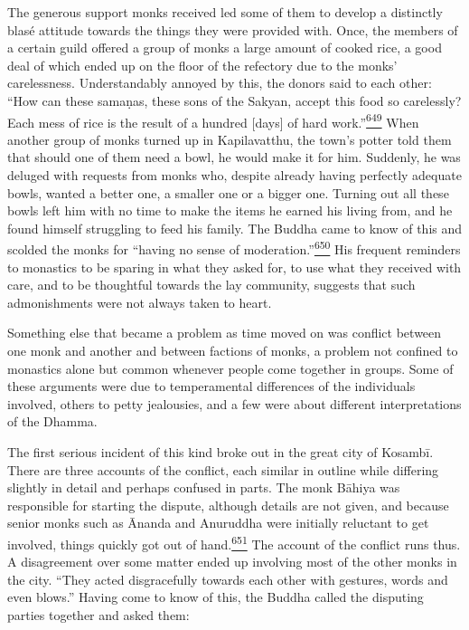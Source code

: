 The generous support monks received led some of them to develop a
distinctly blasé attitude towards the things they were provided with.
Once, the members of a certain guild offered a group of monks a large
amount of cooked rice, a good deal of which ended up on the floor of the
refectory due to the monks' carelessness. Understandably annoyed by
this, the donors said to each other: ``How can these samaṇas, these sons
of the Sakyan, accept this food so carelessly? Each mess of rice is the
result of a hundred {[}days{]} of hard
work.''\label{footprints_split_016.html_fnref649}\hyperref[footprints_split_025.htmlux5cux23fn649]{\textsuperscript{649}}
When another group of monks turned up in Kapilavatthu, the town's potter
told them that should one of them need a bowl, he would make it for him.
Suddenly, he was deluged with requests from monks who, despite already
having perfectly adequate bowls, wanted a better one, a smaller one or a
bigger one. Turning out all these bowls left him with no time to make
the items he earned his living from, and he found himself struggling to
feed his family. The Buddha came to know of this and scolded the monks
for ``having no sense of
moderation.''\label{footprints_split_016.html_fnref650}\hyperref[footprints_split_025.htmlux5cux23fn650]{\textsuperscript{650}}
His frequent reminders to monastics to be sparing in what they asked
for, to use what they received with care, and to be thoughtful towards
the lay community, suggests that such admonishments were not always
taken to heart.

Something else that became a problem as time moved on was conflict
between one monk and another and between factions of monks, a problem
not confined to monastics alone but common whenever people come together
in groups. Some of these arguments were due to temperamental differences
of the individuals involved, others to petty jealousies, and a few were
about different interpretations of the Dhamma.

The first serious incident of this kind broke out in the great city of
Kosambī. There are three accounts of the conflict, each similar in
outline while differing slightly in detail and perhaps confused in
parts. The monk Bāhiya was responsible for starting the dispute,
although details are not given, and because senior monks such as Ānanda
and Anuruddha were initially reluctant to get involved, things quickly
got out of
hand.\label{footprints_split_016.html_fnref651}\hyperref[footprints_split_025.htmlux5cux23fn651]{\textsuperscript{651}}
The account of the conflict runs thus. A disagreement over some matter
ended up involving most of the other monks in the city. ``They acted
disgracefully towards each other with gestures, words and even blows.''
Having come to know of this, the Buddha called the disputing parties
together and asked them:

